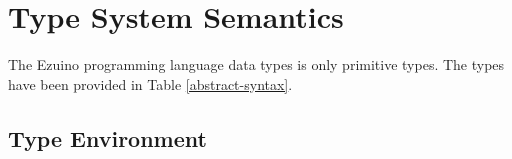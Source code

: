 
\section{Type System Semantics}
The Ezuino programming language data types is only primitive types. The types have been provided in Table \ref{abstract-syntax}.

\subsection{Type Environment}
